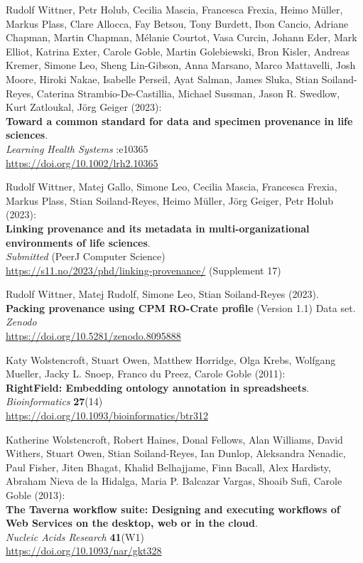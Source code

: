 \begin{thebibliography}{9}
Rudolf Wittner, Petr Holub, Cecilia Mascia, Francesca Frexia, Heimo Müller, Markus Plass, Clare Allocca, Fay Betsou, Tony Burdett, Ibon Cancio, Adriane Chapman, Martin Chapman, Mélanie Courtot, Vasa Curcin, Johann Eder, Mark Elliot, Katrina Exter, Carole Goble, Martin Golebiewski, Bron Kisler, Andreas Kremer, Simone Leo, Sheng Lin-Gibson, Anna Marsano, Marco Mattavelli, Josh Moore, Hiroki Nakae, Isabelle Perseil, Ayat Salman, James Sluka, Stian Soiland-Reyes, Caterina Strambio-De-Castillia, Michael Sussman, Jason R. Swedlow, Kurt Zatloukal, Jörg Geiger (2023): \\
\textbf{Toward a common standard for data and specimen provenance in life sciences}.\\
\emph{Learning Health Systems} :e10365 \\
\url{https://doi.org/10.1002/lrh2.10365}

Rudolf Wittner, Matej Gallo, Simone Leo, Cecilia Mascia, Francesca Frexia, Markus Plass, Stian Soiland-Reyes, Heimo Müller, Jörg Geiger, Petr Holub (2023):\\
\textbf{Linking provenance and its metadata in multi-organizational environments of life sciences}.\\
\emph{Submitted} (PeerJ Computer Science)\\
\url{https://s11.no/2023/phd/linking-provenance/}
(Supplement 17)

Rudolf Wittner, Matej Rudolf, Simone Leo, Stian Soiland-Reyes (2023).\\
\textbf{Packing provenance using CPM RO-Crate profile} (Version 1.1)
Data set.\\
\emph{Zenodo}\\
\url{https://doi.org/10.5281/zenodo.8095888}

Katy Wolstencroft, Stuart Owen, Matthew Horridge, Olga Krebs, Wolfgang Mueller, Jacky L. Snoep, Franco du Preez, Carole Goble (2011): \\
\textbf{RightField: Embedding ontology annotation in spreadsheets}. \\
\emph{Bioinformatics} \textbf{27}(14) \\
\url{https://doi.org/10.1093/bioinformatics/btr312}

Katherine Wolstencroft, Robert Haines, Donal Fellows, Alan Williams,
David Withers, Stuart Owen, Stian Soiland-Reyes, Ian Dunlop, Aleksandra
Nenadic, Paul Fisher, Jiten Bhagat, Khalid Belhajjame, Finn Bacall, Alex
Hardisty, Abraham Nieva de la Hidalga, Maria P. Balcazar Vargas, Shoaib
Sufi, Carole Goble (2013): \\
\textbf{The {Taverna} workflow suite: Designing
and executing workflows of {Web Services} on the desktop, web or in the
cloud}. \\
\emph{Nucleic Acids Research} \textbf{41}(W1) \\
\url{https://doi.org/10.1093/nar/gkt328}


\end{thebibliography}
